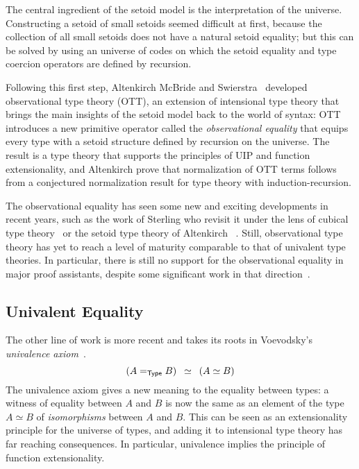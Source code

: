 The central ingredient of the setoid model is the interpretation of the 
universe.
% 
Constructing a setoid of small setoids seemed difficult at first, because 
the collection of all small setoids does not have a natural setoid equality;
but this can be solved by using an 
universe of codes on which the setoid equality and type coercion operators are 
defined by recursion.

Following this first step, Altenkirch McBride and 
Swierstra~ developed observational 
type theory (OTT), an extension of intensional type theory that brings the main 
insights of the setoid model back to the world of syntax:
% 
OTT introduces a new primitive operator called the \emph{observational equality} that 
equips every type with a setoid structure defined by recursion on the universe.
% 
The result is a type theory that supports the principles of UIP and function 
extensionality, and Altenkirch \etal prove that normalization of OTT terms 
follows from a conjectured normalization result for type theory with 
induction-recursion.

The observational equality has seen some new and exciting developments in recent 
years, such as the work of Sterling \etal who revisit it under the lens of 
cubical type theory~ or the setoid
type theory of Altenkirch \etal~.
% 
Still, observational type theory has yet to reach a level of maturity 
comparable to that of univalent type theories.
% 
In particular, there is still no support for the observational equality in
major proof assistants, despite some significant work in that 
direction~.

\subsection{Univalent Equality}
\label{sec:univalence}

The other line of work is more recent and takes its roots in
Voevodsky's \emph{univalence axiom}~.
\[
(A =_{\mathsf{Type}} B) \enskip \simeq \enskip  (A \simeq B)
\]
The univalence axiom gives a new meaning to the equality between types: 
% 
% 
a witness of equality between \( A \) and \( B \) is now the same as an element of the type 
\( A \simeq B \) of \emph{isomorphisms} between \( A \) and \( B \). 
% 
This can be seen as an extensionality principle for the universe of types, and
adding it to intensional type theory has far reaching consequences. 
In particular, univalence implies the principle of function extensionality.

